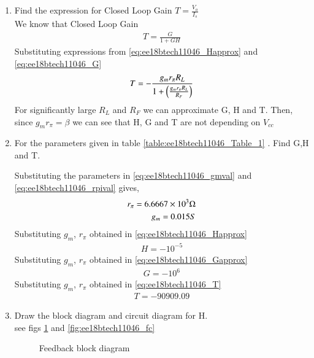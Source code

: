 \begin{enumerate}[label=\arabic*.,ref=\theenumi]
%
\item Find the expression for Closed Loop Gain $T = \frac{V_{o}}{I_{s}}$ \\
%
We know that Closed Loop Gain
\begin{align}
T = \frac{G}{1+GH}
\end{align}
Substituting expressions from \eqref{eq:ee18btech11046_Happrox} and \eqref{eq:ee18btech11046_G}
\begin{align}
T = -\frac{g_{m}r_{\pi}R_{L}}{1+\left(\frac{g_{m}r_{\pi}R_{L}}{R_{F}}\right)}
\label{eq:ee18btech11046_T}
\end{align}
For significantly large $R_{L}$ and $R_{F}$ we can approximate G, H and T. Then, since $g_{m}r_{\pi}=\beta$ we can see that H, G and T are not depending on $V_{cc}$
%

\item For the parameters given in table \ref{table:ee18btech11046_Table_1} . Find G,H and T.
%
\begin{table}[!ht]
\centering

\caption{}
\label{table:ee18btech11046_Table_1}
\end{table}
%
\solution
Substituting the parameters in \eqref{eq:ee18btech11046_gmval} and \eqref{eq:ee18btech11046_rpival} gives,
\begin{align}
r_{\pi} = 6.6667\times 10^{3} \ohm
\\
g_{m} = 0.015 S 
\end{align}
Substituting $g_{m}$, $r_{\pi}$ obtained in 
\eqref{eq:ee18btech11046_Happrox}
\begin{align}
H = -10^{-5}
\end{align}
Substituting $g_{m}$, $r_{\pi}$ obtained in 
\eqref{eq:ee18btech11046_Gapprox}
\begin{align}
G = -10^{6}
\end{align}
Substituting $g_{m}$, $r_{\pi}$ obtained in 
\eqref{eq:ee18btech11046_T}
\begin{align}
T = -90909.09
\end{align}

\item Draw the block diagram and circuit diagram for H.
\\
\solution see figs \ref{fig:ee18btech11046_Hblock}  and \ref{fig:ee18btech11046_fc}
%
\renewcommand{\thefigure}{\theenumi.\arabic{figure}}

\begin{figure}[ht!]
	\begin{center}
		\resizebox{\columnwidth}{!}{}
	\end{center}
	\caption{Feedback block diagram}
	\label{fig:ee18btech11046_Hblock}
\end{figure}


\end{enumerate}
